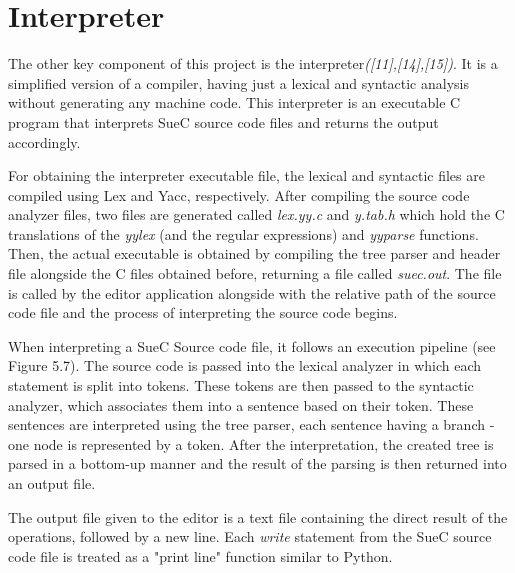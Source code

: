 \documentclass[12pt,a4paper,twoside]{report}
\begin{document}
\section{Interpreter}

The other key component of this project is the interpreter\textit{([11],[14],[15])}. It is a simplified version of a compiler, having just a lexical and syntactic analysis without generating any machine code. This interpreter is an executable C program that interprets SueC source code files and returns the output accordingly.

For obtaining the interpreter executable file, the lexical and syntactic files are compiled using Lex and Yacc, respectively. After compiling the source code analyzer files, two files are generated called \textit{lex.yy.c} and \textit{y.tab.h} which hold the C translations of the \textit{yylex} (and the regular expressions) and \textit{yyparse} functions. Then, the actual executable is obtained by compiling the tree parser and header file alongside the C files obtained before, returning a file called \textit{suec.out}. The file is called by the editor application alongside with the relative path of the source code file and the process of interpreting the source code begins. 

When interpreting a SueC Source code file, it follows an execution pipeline (see Figure 5.7). The source code is passed into the lexical analyzer in which each statement is split into tokens. These tokens are then passed to the syntactic analyzer, which associates them into a sentence based on their token. These sentences are interpreted using the tree parser, each sentence having a branch - one node is represented by a token. After the interpretation, the created tree is parsed in a bottom-up manner and the result of the parsing is then returned into an output file. 

The output file given to the editor is a text file containing the direct result of the operations, followed by a new line. Each \textit{write} statement from the SueC source code file is treated as a "print line" function similar to Python.  
\end{document}
